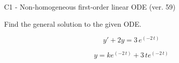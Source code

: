 \begin{exercise}
  \begin{exerciseTitle}C1 - Non-homogeneous first-order linear ODE (ver. 59)\end{exerciseTitle}
  \begin{exerciseStatement}
    
Find the general solution to the given ODE.

    
\[y'+2y= 3 \, e^{\left(-2 \, t\right)}\]

  \end{exerciseStatement}
  \begin{exerciseAnswer}
    
\[y= k e^{\left(-2 \, t\right)} + 3 \, t e^{\left(-2 \, t\right)}\]

  \end{exerciseAnswer}
\end{exercise}